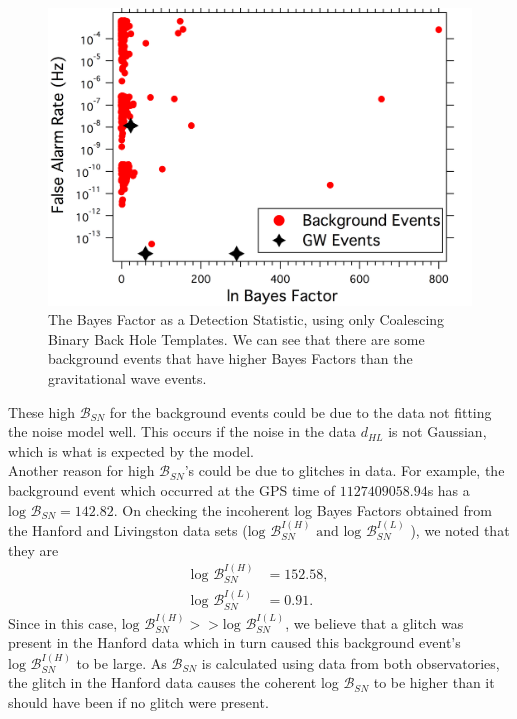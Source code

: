 \documentclass{article}
\begin{document}
 
  
  \begin{figure}[h]
  	\centering
  	\includegraphics[width=1\textwidth]{Figures/FARvsBayesFactor.png} 
  	\caption{The Bayes Factor as a Detection Statistic, using only Coalescing Binary Back Hole Templates. We can see that there are some background events that have higher Bayes Factors than the gravitational wave events.} 
  	\label{Fig:FARvsBayesFactor}
  \end{figure}
  
  
 
 
 
 These high $\mathcal{B}_{SN}$ for the background events could be due to the data not fitting the noise model well. This occurs if the noise in the data $d_{HL}$ is not Gaussian, which is what is expected by the model.\\
 
  Another reason for high $\mathcal{B}_{SN}$'s could be due to glitches in data. For example, the background event which occurred at the GPS time of $1127409058.94$s has a $\text{log }\mathcal{B}_{SN} = 142.82$. On checking the incoherent log Bayes Factors obtained from the Hanford and Livingston data sets ($	\text{log }\mathcal{B}_{SN}^{I(H)}\text{ and } 	\text{log }\mathcal{B}_{SN}^{I(L)}$ ), we noted that they are 
 \begin{align*}
 	\text{log }\mathcal{B}_{SN}^{I(H)}&=152.58, \\
 	\text{log }\mathcal{B}_{SN}^{I(L)} &=0.91.
 	\end{align*}
 Since  in this case, $\text{log }\mathcal{B}_{SN}^{I(H)} > > \text{log }\mathcal{B}_{SN}^{I(L)}$, we believe that a glitch was present in the Hanford data which in turn caused this background event's $\text{log }\mathcal{B}_{SN}^{I(H)}$ to be large. As $\mathcal{B}_{SN}$ is calculated using data from both observatories, the glitch in the Hanford data causes the coherent log $\mathcal{B}_{SN}$ to be higher than it should have been if no glitch were present.\\
 
\end{document}
